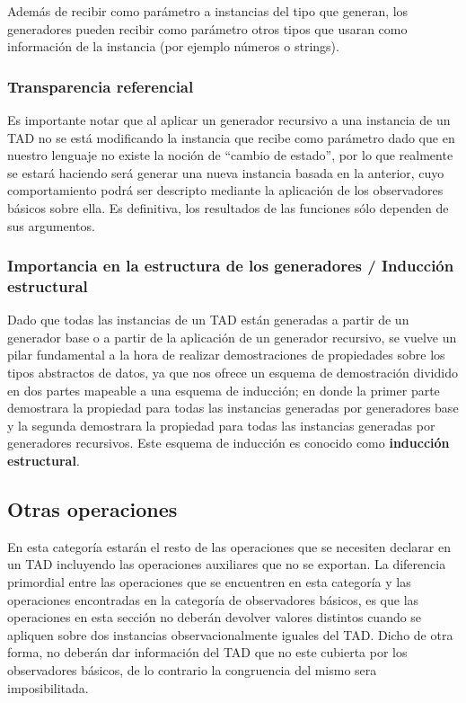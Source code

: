 Adem\'as de recibir como par\'ametro a instancias del tipo que generan, los generadores pueden recibir como par\'ametro otros tipos que usaran como informaci\'on de la instancia (por ejemplo n\'umeros o strings). 

\subsubsection*{Transparencia referencial}
Es importante notar que al aplicar un generador recursivo a una instancia de un TAD no se est\'a modificando la instancia que recibe como par\'ametro dado que en nuestro lenguaje no existe la noci\'on de ``cambio de estado'', por lo que realmente se estar\'a haciendo ser\'a generar una nueva instancia basada en la anterior, cuyo comportamiento podr\'a ser descripto mediante la aplicaci\'on de los observadores b\'asicos sobre ella. Es definitiva, los resultados de las funciones s\'olo dependen de sus argumentos.

\subsubsection*{Importancia en la estructura de los generadores / Inducci\'on estructural}
Dado que todas las instancias de un TAD est\'an generadas a partir de un generador base o a partir de la aplicaci\'on de un generador recursivo, se vuelve un pilar fundamental a la hora de realizar demostraciones de propiedades sobre los tipos abstractos de datos, ya que nos ofrece un esquema de demostraci\'on dividido en dos partes mapeable a una esquema de inducci\'on; en donde la primer parte demostrara la propiedad para todas las instancias generadas por generadores base y la segunda demostrara la propiedad para todas las instancias generadas por generadores recursivos. Este esquema de inducci\'on es conocido como \textbf{inducci\'on estructural}.

\subsection{Otras operaciones}

En esta categor\'ia estar\'an el resto de las operaciones que se necesiten declarar en un TAD incluyendo las operaciones auxiliares que no se exportan. La diferencia primordial entre las operaciones que se encuentren en esta categor\'ia y las operaciones encontradas en la categor\'ia de observadores b\'asicos, es que las operaciones en esta secci\'on no deber\'an devolver valores distintos cuando se apliquen sobre dos instancias observacionalmente iguales del TAD. Dicho de otra forma, no deber\'an dar informaci\'on del TAD que no este cubierta por los observadores b\'asicos, de lo contrario la congruencia del mismo sera imposibilitada.

